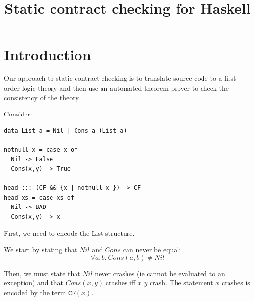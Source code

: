 \documentclass[preprint]{sigplanconf}
\begin{document}
\def\ruleform#1{{\setlength{\fboxrule}{1.2pt}\fbox{\normalsize $#1$}}}
\newcommand{\etrans}[1]{\mathcal{E} \llbracket #1 \rrbracket}
\newcommand{\dtrans}[1]{\mathcal{D} \llbracket #1 \rrbracket}
\newcommand{\ktrans}[1]{\mathcal{K} \llbracket #1 \rrbracket}
\newcommand{\ctrans}[1]{\mathcal{C} \llbracket #1 \rrbracket}
\newcommand{\trans}[1]{\llbracket #1 \rrbracket}

\newcommand{\tot}{\leftrightarrow}

\newtheorem{definition}{Definition}

\newcommand{\unr}{\texttt{UNR}}
\newcommand{\bad}{\texttt{BAD}}
\newcommand{\any}{\texttt{Any}}
\newcommand{\ok}{\texttt{Ok}}
\newcommand{\hprime}{\mathcal{H}'}
\newcommand{\cfc}{\texttt{CF}}
\newcommand{\cf}[1]{\texttt{CF}(#1)}
\newcommand{\weak}[1]{\mbox{$\$$weak}(#1)}
\renewcommand{\min}[1]{\mbox{min}(#1)}


\title{Static contract checking for Haskell}
\maketitle

\section{Introduction}

Our approach to static contract-checking is to translate source code
to a first-order logic theory and
 then use an automated theorem prover
to check the consistency of the theory.

Consider:
\begin{verbatim}
data List a = Nil | Cons a (List a)

notnull x = case x of
  Nil -> False
  Cons(x,y) -> True

head ::: (CF && {x | notnull x }) -> CF
head xs = case xs of
  Nil -> BAD
  Cons(x,y) -> x
\end{verbatim}

First, we need to encode the List structure. 

We start by stating that $Nil$ and $Cons$ can never be equal:
\begin{equation*}
\forall a,b.~Cons(a,b) \neq Nil
\end{equation*}

Then, we must state that $Nil$ never crashes (ie cannot be evaluated
to an exception) and that $Cons(x,y)$  crashes iff  $x$  $y$
 crash. The statement $x$  crashes is encoded by the term $\cf{x}$.
\end{document}
